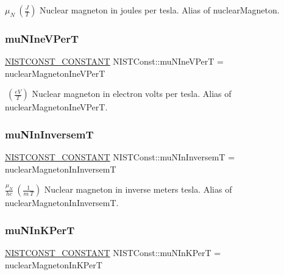 $\mu_N \ (\frac{J}{T})$ Nuclear magneton in joules per tesla. Alias of nuclear\+Magneton. \mbox{\label{group___n_i_s_t_const-_nuclear_magneton_gae0347b2edd524316b9bd807bbf9feb7d}} 
\subsubsection{\texorpdfstring{mu\+N\+Ine\+V\+PerT}{muNIneVPerT}}
{\footnotesize\ttfamily \mbox{\hyperlink{group___n_i_s_t_const-_macros_ga2b0fc1d7452373f816175dd86ce26729}{N\+I\+S\+T\+C\+O\+N\+S\+T\+\_\+\+C\+O\+N\+S\+T\+A\+NT}} N\+I\+S\+T\+Const\+::mu\+N\+Ine\+V\+PerT = nuclear\+Magneton\+Ine\+V\+PerT}

$ \ (\frac{eV}{T})$ Nuclear magneton in electron volts per tesla. Alias of nuclear\+Magneton\+Ine\+V\+PerT. \mbox{\label{group___n_i_s_t_const-_nuclear_magneton_ga02ac16d965def01b1cb39eb084c98006}} 
\subsubsection{\texorpdfstring{mu\+N\+In\+InversemT}{muNInInversemT}}
{\footnotesize\ttfamily \mbox{\hyperlink{group___n_i_s_t_const-_macros_ga2b0fc1d7452373f816175dd86ce26729}{N\+I\+S\+T\+C\+O\+N\+S\+T\+\_\+\+C\+O\+N\+S\+T\+A\+NT}} N\+I\+S\+T\+Const\+::mu\+N\+In\+InversemT = nuclear\+Magneton\+In\+InversemT}

$\frac{\mu_N}{hc} \ (\frac{1}{m\ T})$ Nuclear magneton in inverse meters tesla. Alias of nuclear\+Magneton\+In\+InversemT. \mbox{\label{group___n_i_s_t_const-_nuclear_magneton_ga338d2bb676392956a4aaf46f201678d8}} 
\subsubsection{\texorpdfstring{mu\+N\+In\+K\+PerT}{muNInKPerT}}
{\footnotesize\ttfamily \mbox{\hyperlink{group___n_i_s_t_const-_macros_ga2b0fc1d7452373f816175dd86ce26729}{N\+I\+S\+T\+C\+O\+N\+S\+T\+\_\+\+C\+O\+N\+S\+T\+A\+NT}} N\+I\+S\+T\+Const\+::mu\+N\+In\+K\+PerT = nuclear\+Magneton\+In\+K\+PerT}

